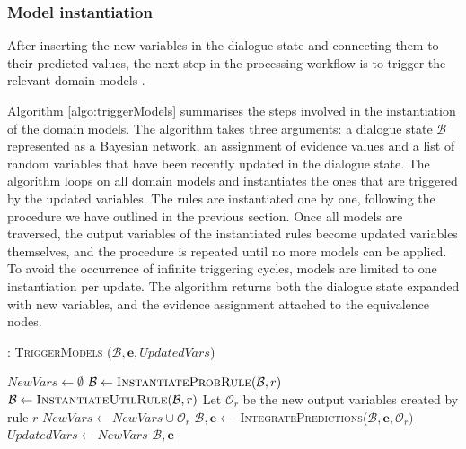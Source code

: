 \subsubsection*{Model instantiation}

After inserting the new variables in the dialogue state and connecting them to their predicted values, the next step in the processing workflow is to trigger the relevant domain models . 

Algorithm \ref{algo:triggerModels} summarises the steps involved in the instantiation of the domain models. The algorithm takes three arguments: a dialogue state $\mathcal{B}$ represented as a Bayesian network, an assignment of evidence values and a list of random variables that have been recently updated in the dialogue state. The algorithm loops on all domain models and instantiates the ones that are triggered by the updated variables. The rules are instantiated one by one, following the procedure we have outlined in the previous section. Once all models are traversed, the output variables of the instantiated rules become updated variables themselves, and the procedure is repeated until no more models can be applied.  To avoid the occurrence of infinite triggering cycles, models are limited to one instantiation per update. The algorithm returns both the dialogue state expanded with new variables, and the evidence assignment attached to the equivalence nodes. 


\begin{algorithm}[h]
\caption{: \textsc{TriggerModels} ($\mathcal{B}, \mathbf{e}, \mathit{UpdatedVars}$)}
\begin{algorithmic}[1] \vspace{1mm}
\STATE $\mathit{NewVars} \leftarrow \emptyset$
\STATE $\mathcal{B} \leftarrow \textsc{InstantiateProbRule}(\mathcal{B},r)$
\STATE $\mathcal{B} \leftarrow \textsc{InstantiateUtilRule}(\mathcal{B},r)$
\ENDIF
\STATE Let $\mathcal{O}_r$ be the new output variables created by rule $r$
\STATE $\mathit{NewVars} \leftarrow \mathit{NewVars} \cup \mathcal{O}_r$
\STATE $\mathcal{B}, \mathbf{e} \leftarrow $ \textsc{IntegratePredictions}($\mathcal{B}, \mathbf{e}, \mathcal{O}_r)$
\ENDFOR
\ENDIF
\ENDFOR 
\STATE $\mathit{UpdatedVars} \leftarrow \mathit{NewVars}$
\ENDWHILE 
\RETURN $\mathcal{B}, \mathbf{e}$
\end{algorithmic}
\label{algo:triggerModels}
\end{algorithm}


